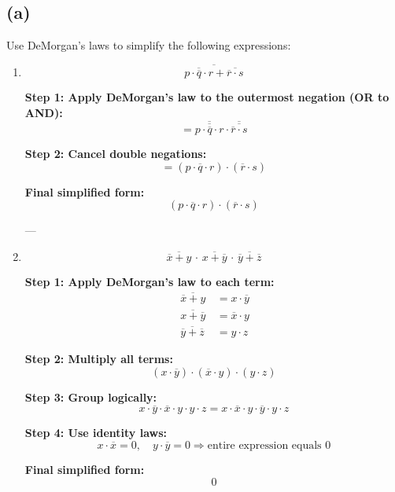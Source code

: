 \documentclass{article}
\begin{document}
\subsection*{(a)}

Use DeMorgan's laws to simplify the following expressions:

\begin{enumerate}[label=\roman*.]

\item
\[
\overline{\, \overline{p \cdot \overline{q} \cdot r} + \overline{ \overline{r} \cdot s } \,}
\]

\textbf{Step 1: Apply DeMorgan's law to the outermost negation (OR to AND):}
\[
= \overline{ \overline{p \cdot \overline{q} \cdot r} } \cdot \overline{ \overline{ \overline{r} \cdot s } }
\]

\textbf{Step 2: Cancel double negations:}
\[
= (p \cdot \overline{q} \cdot r) \cdot (\overline{r} \cdot s)
\]

\textbf{Final simplified form:}
\[
\boxed{(p \cdot \overline{q} \cdot r) \cdot (\overline{r} \cdot s)}
\]

---

\item
\[
\overline{\, \overline{x} + y \,} \cdot \overline{\, x + \overline{y} \,} \cdot \overline{\, \overline{y} + \overline{z} \,}
\]

\textbf{Step 1: Apply DeMorgan's law to each term:}
\begin{align*}
\overline{\, \overline{x} + y \,} &= x \cdot \overline{y} \\
\overline{\, x + \overline{y} \,} &= \overline{x} \cdot y \\
\overline{\, \overline{y} + \overline{z} \,} &= y \cdot z
\end{align*}

\textbf{Step 2: Multiply all terms:}
\[
(x \cdot \overline{y}) \cdot (\overline{x} \cdot y) \cdot (y \cdot z)
\]

\textbf{Step 3: Group logically:}
\[
x \cdot \overline{y} \cdot \overline{x} \cdot y \cdot y \cdot z
= x \cdot \overline{x} \cdot y \cdot \overline{y} \cdot y \cdot z
\]

\textbf{Step 4: Use identity laws:}
\[
x \cdot \overline{x} = 0, \quad y \cdot \overline{y} = 0
\Rightarrow \text{entire expression equals } 0
\]

\textbf{Final simplified form:}
\[
\boxed{0}
\]

\end{enumerate}
\end{document}
